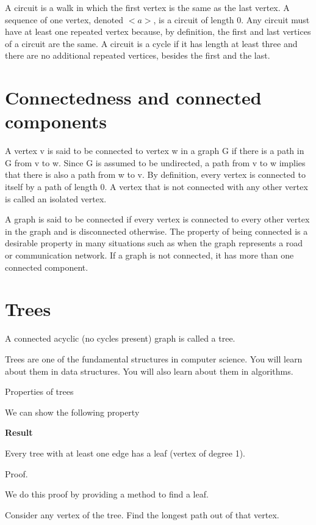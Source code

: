 \documentclass[12pt]{article}
\begin{document}
A circuit is a walk in which the first vertex is the same as the last vertex. A sequence of one vertex, denoted $<a>$, is a circuit of length 0. Any circuit must have at least one repeated vertex because, by definition, the first and last vertices of a circuit are the same. A circuit is a cycle if it has length at least three and there are no additional repeated vertices, besides the first and the last. 

\section*{Connectedness and connected components}

A vertex v is said to be connected to vertex w in a graph G if there is a path in G from v to w. Since G is assumed to be undirected, a path from v to w implies that there is also a path from w to v. By definition, every vertex is connected to itself by a path of length 0. A vertex that is not connected with any other vertex is called an isolated vertex.

A graph is said to be connected if every vertex is connected to every other vertex in the graph and is disconnected otherwise. The property of being connected is a desirable property in many situations such as when the graph represents a road or communication network. If a graph is not connected, it has more than one connected component. 

\section*{Trees}

A connected acyclic (no cycles present) graph is called a tree. 

Trees are one of the fundamental structures in computer science. You will learn about them in data structures. You will also learn about them in algorithms.

Properties of trees

We can show the following property
 

\textbf{Result}

Every tree with at least one edge has a leaf (vertex of degree 1).

\vspace*{0.1in}

Proof.

We do this proof by providing a method to find a leaf.

Consider any vertex of the tree.  Find the longest path out of that vertex. 
\end{document}
